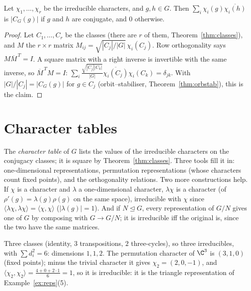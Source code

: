 \begin{corollary}\label{cor:columns}
Let $\chi_1,\dots,\chi_r$ be the irreducible characters, and $g,h\in G$. Then $\sum_i\chi_i(g)\overline{\chi_i(h)}$ is $|C_G(g)|$ if $g$ and $h$ are conjugate, and $0$ otherwise.
\end{corollary}
\begin{proof}
Let $C_1,\dots,C_r$ be the classes (there are $r$ of them, Theorem~\ref{thm:classes}), and $M$ the $r\times r$ matrix $M_{ij}=\sqrt{|C_j|/|G|}\,\chi_i(C_j)$. Row orthogonality says $M\overline M^{\,T}=I$. A square matrix with a right inverse is invertible with the same inverse, so $\overline M^{\,T}M=I$: $\sum_i\frac{\sqrt{|C_j||C_k|}}{|G|}\overline{\chi_i(C_j)}\chi_i(C_k)=\delta_{jk}$. With $|G|/|C_j|=|C_G(g)|$ for $g\in C_j$ (orbit--stabiliser, Theorem~\ref{thm:orbstab}), this is the claim.
\end{proof}

\section{Character tables}

The \emph{character table} of $G$ lists the values of the irreducible characters on the conjugacy classes; it is square by Theorem~\ref{thm:classes}. Three tools fill it in: one-dimensional representations, permutation representations (whose characters count fixed points), and the orthogonality relations. Two more constructions help. If $\chi$ is a character and $\lambda$ a one-dimensional character, $\lambda\chi$ is a character (of $\rho'(g)=\lambda(g)\rho(g)$ on the same space), irreducible with $\chi$ since $\langle\lambda\chi,\lambda\chi\rangle=\langle\chi,\chi\rangle$ ($|\lambda(g)|=1$). And if $N\trianglelefteq G$, every representation of $G/N$ gives one of $G$ by composing with $G\to G/N$; it is irreducible iff the original is, since the two have the same matrices.

\begin{example}[$\mathfrak S_3$]\label{ex:s3}
Three classes (identity, $3$ transpositions, $2$ three-cycles), so three irreducibles, with $\sum d_i^2=6$: dimensions $1,1,2$. The permutation character of $\C^3$ is $(3,1,0)$ (fixed points); minus the trivial character it gives $\chi_2=(2,0,-1)$, and $\langle\chi_2,\chi_2\rangle=\frac{4+0+2\cdot1}6=1$, so it is irreducible: it is the triangle representation of Example~\ref{ex:reps}(5).
\end{example}

